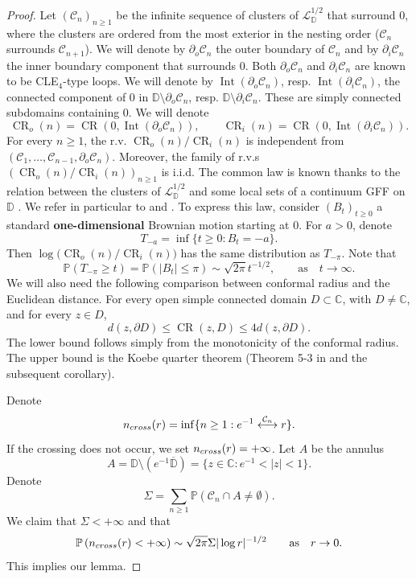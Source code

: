 \documentclass[11pt]{article}
\theoremstyle{remark}
\newcommand{\C}{\mathbb{C}}
\newcommand{\D}{\mathbb{D}}
\newcommand{\Cc}{\mathcal{C}}
\newcommand{\Lc}{\mathcal{L}}
\newcommand{\Prob}[1]{\mathbb{P} \left( #1 \right) }
\DeclareMathOperator{\CR}{CR}
\DeclareMathOperator{\Int}{Int}
\numberwithin{equation}{section}
\begin{document}
\begin{proof}
Let $(\Cc_{n})_{n\geq 1}$ be the infinite sequence of clusters of 
$\Lc_\D^{1/2}$ that surround $0$,
where the clusters are ordered from the most exterior in the nesting order
($\Cc_{n}$ surrounds $\Cc_{n+1}$).
We will denote by $\partial_{o}\Cc_{n}$ the outer boundary of
$\Cc_{n}$ and by $\partial_{i}\Cc_{n}$ the inner boundary component that surrounds $0$. 
Both $\partial_{o}\Cc_{n}$ and $\partial_{i}\Cc_{n}$ are known to be CLE$_{4}$-type
loops.
We will denote by $\Int(\partial_{o}\Cc_{n})$, resp.
$\Int(\partial_{i}\Cc_{n})$, the connected component of $0$ in
$\D\setminus \partial_{o}\Cc_{n}$, resp. $\D\setminus \partial_{i}\Cc_{n}$.
These are simply connected subdomains containing $0$.
We will denote
\[
\CR_{o}(n) = \CR(0,\Int(\partial_{o}\Cc_{n})),
\qquad
\CR_{i}(n) = \CR(0,\Int(\partial_{i}\Cc_{n})).
\]
For every $n\geq 1$, the r.v.
$\CR_{o}(n)/\CR_{i}(n)$ is independent from
$(\Cc_{1},\dots,\Cc_{n-1},\partial_{o}\Cc_{n})$.
Moreover, the family of r.v.s
$(\CR_{o}(n)/\CR_{i}(n))_{n\geq 1}$ is i.i.d.
The common law is known thanks to the relation between the clusters of 
$\Lc_\D^{1/2}$ and some local sets of a continuum GFF on $\D$
\cite{ALS2,ALS1,QianWerner19Clusters}.
We refer in particular to
\cite[Corollary 5.4]{ALS2} and \cite[Proposition 4.8]{ALS1}.
To express this law, consider $(B_{t})_{t\geq 0}$
a standard \textbf{one-dimensional} Brownian motion starting at $0$.
For $a>0$, denote
\begin{displaymath}
T_{-a} = \inf\{t\geq 0 : B_{t} = -a\}.
\end{displaymath}
Then $\log\big(\CR_{o}(n)/\CR_{i}(n)\big)$ has the same distribution as
$T_{-\pi}$.
Note that
\[
\Prob{T_{-\pi}\geq t}
=\Prob{\vert B_{t} \vert \leq \pi} \sim \sqrt{2\pi} t^{-1/2},
\quad \quad \text{as} \quad t \to \infty.
\]
We will also need the following comparison between conformal radius and the
Euclidean distance.
For every open simple connected domain $D\subset\C$, with $D\neq \C$,
and for every $z\in D$,
\begin{displaymath}
d(z,\partial D)\leq\CR(z,D)\leq 4 d(z,\partial D).
\end{displaymath}
The lower bound follows simply from the monotonicity of the
conformal radius.
The upper bound is the Koebe quarter theorem 
(Theorem 5-3 in \cite{Ahlfors2010ConfInv} and the subsequent corollary).

Denote
\[
n_{\rm cross}(r) = 
\inf\{n\geq 1 : e^{-1} \overset{\Cc_{n}}{\longleftrightarrow} r\}.
\]
If the crossing does not occur, we set $n_{\rm cross}(r) = +\infty$.
Let $A$ be the annulus
\[
A = \D\setminus(e^{-1}\overline{\D}) = 
\{z\in\C : e^{-1}<\vert z\vert <1\}.
\]
Denote
\[
\Sigma = 
\sum_{n\geq 1}\Prob{\Cc_{n}\cap A\neq\emptyset}.
\]
We claim that $\Sigma < +\infty$ and that
\begin{equation}
\label{E:pf_crossing_goal}
\Prob{n_{\rm cross}(r)<+\infty}
\sim \sqrt{2\pi}\Sigma \vert\log r\vert^{-1/2} \quad \quad \text{as} \quad r \to 0.
\end{equation}
This implies our lemma.


\end{proof}
\end{document}
